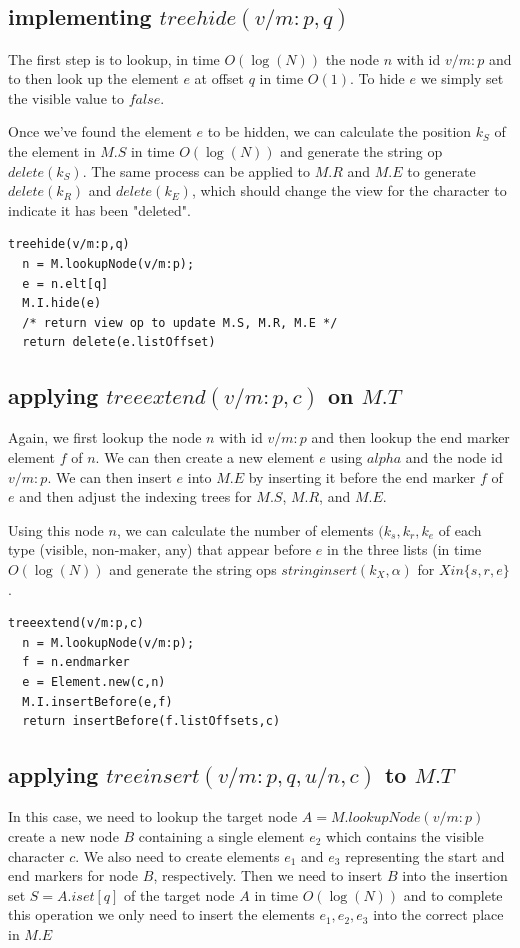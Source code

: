 \documentclass{amsart}
\begin{document}
\subsection{implementing $treehide(v/m:p,q)$}
The first step is to lookup, in time $O(\log(N))$ the node $n$ with id $v/m:p$
and to then look up the element $e$ at offset $q$ in time $O(1)$. 
To hide $e$ we simply set the visible value to $false$.

Once we've found the element $e$ to be hidden, we can
calculate the position $k_S$ of the element in $M.S$ in time $O(\log(N))$
and generate the string op $delete(k_S)$. The same process can be applied to
$M.R$ and $M.E$ to generate $delete(k_R)$ and $delete(k_E)$, which should
change the view for the character to indicate it has been "deleted".

\begin{verbatim}
treehide(v/m:p,q)
  n = M.lookupNode(v/m:p);
  e = n.elt[q]
  M.I.hide(e)
  /* return view op to update M.S, M.R, M.E */
  return delete(e.listOffset)
\end{verbatim}


\subsection{applying $treeextend(v/m:p,c)$ on $M.T$}
Again, we first lookup the node $n$ with id $v/m:p$ and then lookup the 
end marker element $f$ of $n$. We can then create a new element $e$
using $alpha$ and the node id $v/m:p$. We can then insert $e$ into
$M.E$ by inserting it before the end marker $f$ of $e$ and then adjust 
the indexing trees for $M.S$, $M.R$, and $M.E$.

Using this node $n$, we can calculate the number
of elements $(k_s,k_r,k_e$ of each type (visible, non-maker, any) that appear before $e$ in
the three lists (in time $O(\log(N))$ and generate the string ops $stringinsert(k_X,\alpha)$ for $X in \{s,r,e\}$.

\begin{verbatim}
treeextend(v/m:p,c)
  n = M.lookupNode(v/m:p);
  f = n.endmarker
  e = Element.new(c,n)
  M.I.insertBefore(e,f)
  return insertBefore(f.listOffsets,c)
\end{verbatim}

\subsection{applying $treeinsert(v/m:p,q,u/n,c)$ to $M.T$}
In this case, we need to lookup the target node $A = M.lookupNode(v/m:p)$ create a new node $B$ containing a single element
$e_2$ which contains the visible character $c$. We also need to create elements $e_1$ and $e_3$ representing the start and end markers for node $B$, respectively.
Then we need to insert $B$
into the insertion set $S=A.iset[q]$ of the target node $A$ in time $O(\log(N))$ 
and to complete this operation we only need to insert the elements $e_1,e_2,e_3$ into the correct place in $M.E$
\end{document}
